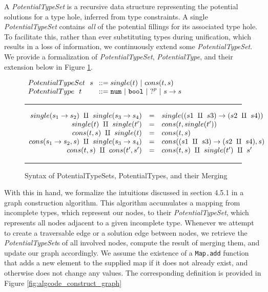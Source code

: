 A \textit{PotentialTypeSet} is a recursive data structure representing the potential solutions for a type hole, inferred from type constraints. A single \emph{PotentialTypeSet} contains \emph{all} of the potential fillings for its associated type hole. To facilitate this, rather than ever substituting types during unification, which results in a loss of information, we continuously extend some \emph{PotentialTypeSet}. We provide a formalization of \textit{PotentialTypeSet}, \textit{PotentialType}, and their extension below in Figure \ref{fig:possible_type_sets}.

\begin{figure}[hbp!]
\centering
\vspace{-3px} 
$\arraycolsep=4pt\begin{array}{lll}
PotentialTypeSet~~ s & ::= 
single(t) ~\vert~ 
cons(t, s)
\\
PotentialType~~ t & ::= 
  \tnum ~\vert~
  \tbool ~\vert~
  \tehole^p ~\vert~
  \tarr{s}{s}
  \\
\end{array}$
\label{fig:syntax_possible_type_sets}
\vspace{5px}
\hrule
\[\begin{array}{rcl}
    single(s_1 \rightarrow s_2) ~\amalg~ single(s_3 \rightarrow s_4) & = & single({(s1 ~\amalg~ s3) \rightarrow (s2 ~\amalg~ s4)}) \\
    single(t) ~\amalg~ single(t') & = & cons(t, single(t')) \\
    cons(t,s) ~\amalg~ single(t) & = & cons(t, s) \\
    cons(s_1 \rightarrow s_2, s) ~\amalg~ single(s_3 \rightarrow s_4) & = & cons((s1 ~\amalg~ s3) \rightarrow (s2 ~\amalg~ s4) , s) \\
    cons(t,s) ~\amalg~ cons(t',s') & = & cons(t,s) ~\amalg~ single(t') ~\amalg~ s' \\
\end{array}\] 
\caption{Syntax of PotentialTypeSets, PotentialTypes, and their Merging}
\vspace{5px} 
\hrule
\label{fig:possible_type_sets}
\vspace{-5px}
\end{figure}

With this in hand, we formalize the intuitions discussed in section 4.5.1 in a graph construction algorithm. This algorithm accumulates a mapping from incomplete types, which represent our nodes, to their \emph{PotentialTypeSet}, which represents all nodes adjacent to a given incomplete type. Whenever we attempt to create a traversable edge or a solution edge between nodes, we retrieve the \emph{PotentialTypeSet}s of all involved nodes, compute the result of merging them, and update our graph accordingly. We assume the existence of a \lstinline{Map.add} function that adds a new element to the supplied map if it does not already exist, and otherwise does not change any values. The corresponding definition is provided in Figure \ref{fig:algcode_construct_graph}

